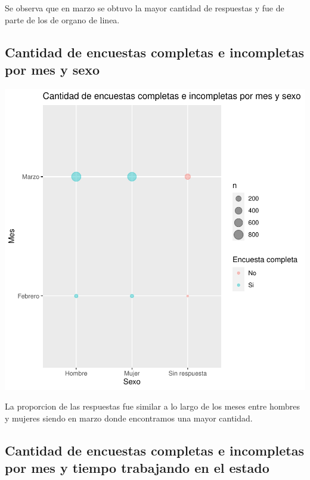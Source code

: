 \documentclass{article}
\begin{document}
Se observa que en marzo se obtuvo la mayor cantidad de respuestas y fue de parte de los de organo de linea.

\subsection{Cantidad de encuestas completas e incompletas por mes y sexo}

\includegraphics{seguimientov3-057}

La proporcion de las respuestas fue similar a lo largo de los meses entre hombres y mujeres siendo en marzo donde encontramos una mayor cantidad.

\subsection{Cantidad de encuestas completas e incompletas por mes y tiempo trabajando en el estado}
\end{document}
